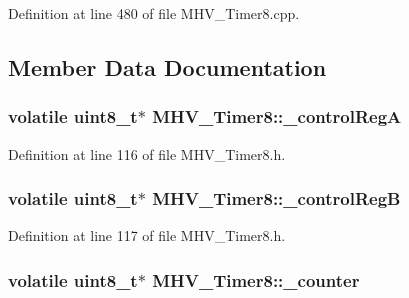 \-Definition at line 480 of file \-M\-H\-V\-\_\-\-Timer8.\-cpp.



\subsection{\-Member \-Data \-Documentation}
\hypertarget{class_m_h_v___timer8_a2370aea351bfaed055c42b2ecfe6c930}{
\subsubsection[{\-\_\-control\-Reg\-A}]{\setlength{\rightskip}{0pt plus 5cm}volatile uint8\-\_\-t$\ast$ {\bf \-M\-H\-V\-\_\-\-Timer8\-::\-\_\-control\-Reg\-A}}}
\label{class_m_h_v___timer8_a2370aea351bfaed055c42b2ecfe6c930}


\-Definition at line 116 of file \-M\-H\-V\-\_\-\-Timer8.\-h.

\hypertarget{class_m_h_v___timer8_ab713d8f3b71551b6146703d9ecfc5301}{
\subsubsection[{\-\_\-control\-Reg\-B}]{\setlength{\rightskip}{0pt plus 5cm}volatile uint8\-\_\-t$\ast$ {\bf \-M\-H\-V\-\_\-\-Timer8\-::\-\_\-control\-Reg\-B}}}
\label{class_m_h_v___timer8_ab713d8f3b71551b6146703d9ecfc5301}


\-Definition at line 117 of file \-M\-H\-V\-\_\-\-Timer8.\-h.

\hypertarget{class_m_h_v___timer8_ae99499e5828be6ed0c312cd43821a7c3}{
\subsubsection[{\-\_\-counter}]{\setlength{\rightskip}{0pt plus 5cm}volatile uint8\-\_\-t$\ast$ {\bf \-M\-H\-V\-\_\-\-Timer8\-::\-\_\-counter}}}
\label{class_m_h_v___timer8_ae99499e5828be6ed0c312cd43821a7c3}


